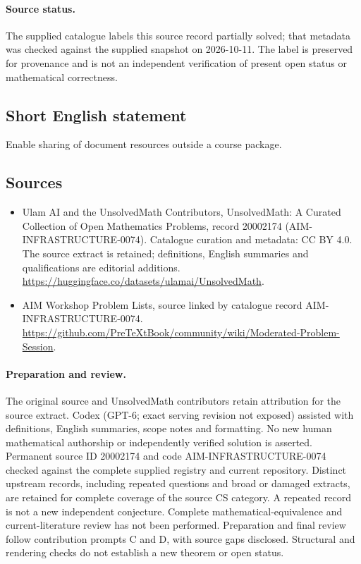 \documentclass[11pt]{article}
\begin{document}
\paragraph{Source status.}
The supplied catalogue labels this source record partially solved; that metadata was checked against the supplied snapshot on 2026-10-11. The label is preserved for provenance and is not an independent verification of present open status or mathematical correctness.
\subsection{Short English statement}
Enable sharing of document resources outside a course package.
\subsection{Sources}
\begin{itemize}
\item[\hypertarget{source:20002174:1}{S1}] Ulam AI and the UnsolvedMath Contributors, UnsolvedMath: A Curated Collection of Open Mathematics Problems, record 20002174 (AIM-INFRASTRUCTURE-0074). Catalogue curation and metadata: CC BY 4.0. The source extract is retained; definitions, English summaries and qualifications are editorial additions.
\url{https://huggingface.co/datasets/ulamai/UnsolvedMath}.
\item[\hypertarget{source:20002174:2}{S2}] AIM Workshop Problem Lists, source linked by catalogue record AIM-INFRASTRUCTURE-0074.
\url{https://github.com/PreTeXtBook/community/wiki/Moderated-Problem-Session}.
\end{itemize}
\paragraph{Preparation and review.}
The original source and UnsolvedMath contributors retain attribution for the source extract. Codex (GPT-6; exact serving revision not exposed) assisted with definitions, English summaries, scope notes and formatting. No new human mathematical authorship or independently verified solution is asserted. Permanent source ID 20002174 and code AIM-INFRASTRUCTURE-0074 checked against the complete supplied registry and current repository. Distinct upstream records, including repeated questions and broad or damaged extracts, are retained for complete coverage of the source CS category. A repeated record is not a new independent conjecture. Complete mathematical-equivalence and current-literature review has not been performed. Preparation and final review follow contribution prompts C and D, with source gaps disclosed. Structural and rendering checks do not establish a new theorem or open status.
\label{end:20002174}
\end{document}

